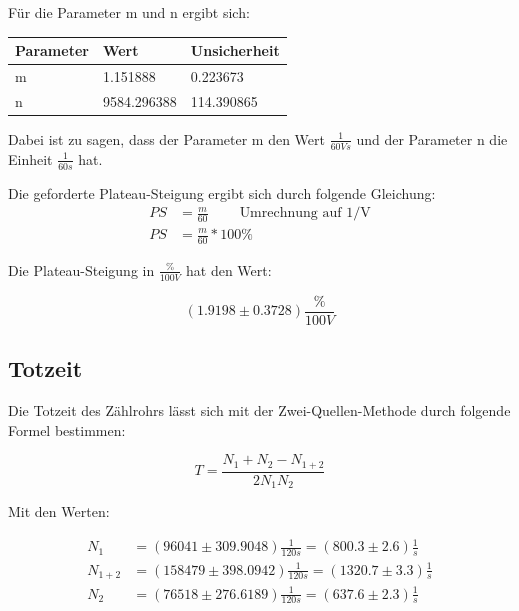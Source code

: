 \noindent Für die Parameter m und n ergibt sich:

\begin{center}
    \begin{tabular}{ll@{${}\pm{}$}l}
        \toprule
        Parameter & Wert & Unsicherheit\\
        \midrule
        m &    1.151888 & 0.223673 \\
        n &   9584.296388 & 114.390865 \\
        \bottomrule
        
    \end{tabular}
\end{center}

\noindent Dabei ist zu sagen, dass der Parameter m den Wert $\frac{1}{60Vs}$ und der Parameter n die Einheit $\frac{1}{60s}$ hat.

\noindent Die geforderte Plateau-Steigung ergibt sich durch folgende Gleichung:
\begin{align}
    PS &= \frac{m}{60} \;\;\;\;\;\;\;\;  \text{Umrechnung auf 1/V} \nonumber \\
    PS &= \frac{m}{60}  * 100\%  \nonumber 
\end{align}

\noindent Die Plateau-Steigung in $\frac{\%}{100V}$ hat den Wert:

\begin{displaymath}
    (1.9198 \pm 0.3728) \frac{\%}{100V}
\end{displaymath}


\subsection{Totzeit}

\noindent Die Totzeit des Zählrohrs lässt sich mit der Zwei-Quellen-Methode durch folgende Formel bestimmen:

\begin{displaymath}
    T = \frac{N_1+N_2-N_{1+2}}{2N_1N_2}
\end{displaymath}

\noindent Mit den Werten:

\begin{align}
    N_1 &= (96041 \pm 309.9048) \frac{1}{120s} = (800.3 \pm 2.6) \frac{1}{s} \nonumber \\
    N_{1+2} &= (158479 \pm 398.0942) \frac{1}{120s} = (1320.7 \pm 3.3) \frac{1}{s} \nonumber \\
    N_2 &= (76518 \pm 276.6189) \frac{1}{120s} = (637.6 \pm 2.3) \frac{1}{s} \nonumber
\end{align}

